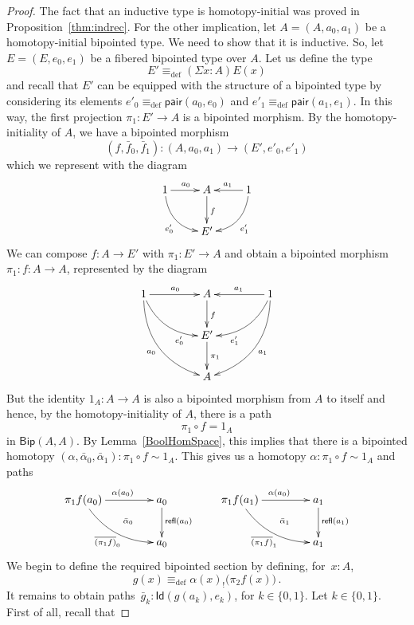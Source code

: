 \documentclass[10pt,a4paper,oneside,reqno]{amsart}
\numberwithin{equation}{section}
\theoremstyle{mythm}
\theoremstyle{mydef}
\theoremstyle{myrmk}
\newcommand{\deq}{\equiv}
\newcommand{\defeq}{\deq_{\mathrm{def}}}
\newcommand{\co}{\colon}
\newcommand{\pair}{\mathsf{pair}}
\newcommand{\Id}{\mathsf{Id}}
\newcommand{\refl}{\mathsf{refl}}
\newcommand{\Bip}{\mathsf{Bip}}
\begin{document}
\begin{proof} The fact that an inductive type is homotopy-initial was proved in 
Proposition~\ref{thm:indrec}. For the other implication, 
let $A = (A, a_0, a_1)$ be a homotopy-initial bipointed type. We need to show that it is inductive. 
So, let $E = (E, e_0, e_1)$ be a fibered bipointed type over $A$. Let us define the type 
\[
E' \defeq (\Sigma x \co A) E(x) 
\]
and recall that $E'$ can be equipped with the structure of a bipointed type by considering its elements $e'_0 \defeq \pair(a_0, e_0)$ and $e'_1 \defeq \pair(a_1, e_1)$. In this way,  the first projection $\pi_1 \co E' \to A$ is a bipointed morphism. By the homotopy-initiality of $A$, we have a bipointed morphism 
\[
(f, \bar{f}_0, \bar{f}_1) \co (A, a_0, a_1)  \to (E', e'_0, e'_1) 
\]
which we represent with the diagram
\[
\xymatrix{
1 \ar@/_1pc/[dr]_{e'_0} \ar[r]^{a_0} & A  \ar[d]^f & 1 \ar[l]_{a_1} \ar@/^1pc/[dl]^{e'_1} \\
 & E' & }
 \]
 We can compose $f \co A \to E'$ with $\pi_1 \co E' \to A$ and obtain a bipointed morphism $\pi_1 \co f \co A \to A$, represented by the diagram
  \[
\xymatrix@C=1.5cm{
1 \ar@/_1pc/[dr]_(.7){e'_0} \ar[r]^{a_0} \ar@/_1.5pc/[ddr]_{a_0}  & A  \ar[d]^f & 1 \ar[l]_{a_1} \ar@/^1pc/[dl]^(.7){e'_1} \ar@/^1.5pc/[ddl]^{a_1}  \\
 & E' \ar[d]^{\pi_1} & \\
 & A &  }
 \]
But the identity $1_A \co A \to A$ is also a bipointed morphism from $A$ to itself and hence, by the homotopy-initiality of $A$, there is a path
\[
\pi_1 \circ f = 1_A 
\]
in $\Bip(A,A)$. By Lemma~\ref{BoolHomSpace}, this implies that there  is a bipointed homotopy $(\alpha,
\bar{\alpha}_0,\bar{\alpha}_1) \co \pi_1 \circ f \sim 1_A$. This gives us a homotopy $\alpha \co \pi_1 \circ f \sim 1_A$ and paths
\[
\xymatrix@C=1.5cm{
\pi_1 f (a_0) \ar[r]^{\alpha(a_0)} \ar@/_1pc/[dr]_{\overline{(\pi_1 f)}_0} \ar@{}[dr]|{\quad \bar{\alpha}_0}  & a_0 \ar[d]^{\refl(a_0)} \\
 & a_0 } \qquad
 \xymatrix@C=1.5cm{
\pi_1 f (a_1) \ar[r]^{\alpha(a_0)} \ar@/_1pc/[dr]_{\overline{(\pi_1 f)}_1} \ar@{}[dr]|{\quad \bar{\alpha}_1}  & a_1 \ar[d]^{\refl(a_1)} \\
 & a_1 }
\]
We begin to define the required bipointed section by defining, for~$x \co A$, 
\begin{equation}
\label{equ:defreqsection}
g(x) \defeq \alpha(x)_{!} \big( \pi_2 f (x) \big) \, .
\end{equation}
It remains to obtain paths~$\bar{g}_k \co \Id( g(a_k), e_k)$, for $k \in \{0, 1\}$.  Let $k \in \{0, 1\}$. First of all, recall that 

\end{proof}
\end{document}
